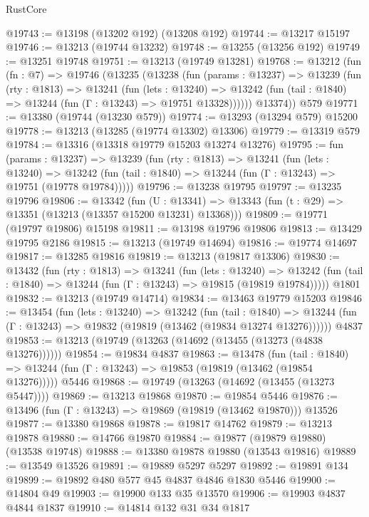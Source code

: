 \begin{lexlean}{RustCore}
\begin{coremodule}
@19743 := @13198 (@13202 @192) (@13208 @192)
@19744 := @13217 @15197
@19746 := @13213 (@19744 @13232)
@19748 := @13255 (@13256 @192)
@19749 := @13251 @19748
@19751 := @13213 (@19749 @13281)
@19768 := @13212
    (fun (fn : @7) =>
    @19746
      (@13235
        (@13238
          (fun (params : @13237) =>
          @13239
            (fun (rty : @1813) =>
            @13241
              (fun (lets : @13240) =>
              @13242 (fun (tail : @1840) => @13244 (fun (Γ : @13243) => @19751 @13328))))))
        @13374))
    @579
@19771 := @13380 (@19744 (@13230 @579))
@19774 := @13293 (@13294 @579) @15200
@19778 := @13213 (@13285 (@19774 @13302) @13306)
@19779 := @13319 @579
@19784 := @13316 (@13318 @19779 @15203 @13274 @13276)
@19795 := fun (params : @13237) =>
  @13239
    (fun (rty : @1813) =>
    @13241
      (fun (lets : @13240) =>
      @13242 (fun (tail : @1840) => @13244 (fun (Γ : @13243) => @19751 (@19778 @19784)))))
@19796 := @13238 @19795
@19797 := @13235 @19796
@19806 := @13342
    (fun (U : @13341) => @13343 (fun (t : @29) => @13351 (@13213 (@13357 @15200 @13231) @13368)))
@19809 := @19771 (@19797 @19806) @15198
@19811 := @13198 @19796 @19806
@19813 := @13429 @19795 @2186
@19815 := @13213 (@19749 @14694)
@19816 := @19774 @14697
@19817 := @13285 @19816
@19819 := @13213 (@19817 @13306)
@19830 := @13432
    (fun (rty : @1813) =>
    @13241
      (fun (lets : @13240) =>
      @13242 (fun (tail : @1840) => @13244 (fun (Γ : @13243) => @19815 (@19819 @19784)))))
    @1801
@19832 := @13213 (@19749 @14714)
@19834 := @13463 @19779 @15203
@19846 := @13454
    (fun (lets : @13240) =>
    @13242
      (fun (tail : @1840) =>
      @13244 (fun (Γ : @13243) => @19832 (@19819 (@13462 (@19834 @13274 @13276))))))
    @4837
@19853 := @13213 (@19749 (@13263 (@14692 (@13455 (@13273 (@4838 @13276))))))
@19854 := @19834 @4837
@19863 := @13478
    (fun (tail : @1840) => @13244 (fun (Γ : @13243) => @19853 (@19819 (@13462 (@19854 @13276)))))
    @5446
@19868 := @19749 (@13263 (@14692 (@13455 (@13273 @5447))))
@19869 := @13213 @19868
@19870 := @19854 @5446
@19876 := @13496 (fun (Γ : @13243) => @19869 (@19819 (@13462 @19870))) @13526
@19877 := @13380 @19868
@19878 := @19817 @14762
@19879 := @13213 @19878
@19880 := @14766 @19870
@19884 := @19877 (@19879 @19880) (@13538 @19748)
@19888 := @13380 @19878 @19880 (@13543 @19816)
@19889 := @13549 @13526
@19891 := @19889 @5297 @5297
@19892 := @19891 @134
@19899 := @19892 @480 @577 @45 @4837 @4846 @1830 @5446
@19900 := @14804 @49
@19903 := @19900 @133 @35 @13570
@19906 := @19903 @4837 @4844 @1837
@19910 := @14814 @132 @31 @34 @1817

\end{coremodule}
\end{lexlean}
